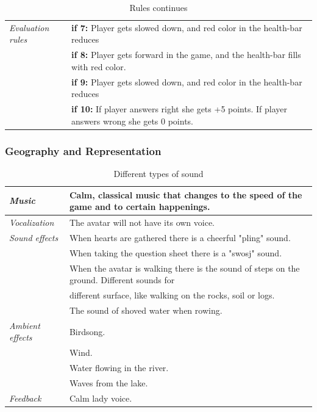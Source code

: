 \begin{table} [H]
\centering
\begin{tabular}{|p{}|p{}|}
\hline
\emph{Evaluation rules} & \textbf{if 7:} Player gets slowed down, and red color in the health-bar reduces   \\ \cline{2-2}
& \textbf{if 8:} Player gets forward in the game, and the health-bar fills with red color.   \\ \cline{2-2}
& \textbf{if 9:} Player gets slowed down, and red color in the health-bar reduces   \\ \cline{2-2}
& \textbf{if 10:} If player answers right she gets +5 points. If player answers wrong she gets 0 points.  \\ \hline
\end{tabular}
\caption[Rules in the "Nature Trail" game]{Rules continues}
\label{tab:rules11}
\end{table}  

\subsubsection{Geography and Representation}

\begin{table} [H]
\centering
\begin{tabular}{|p{}|p{}|}
\hline
\emph{Music} & Calm, classical music that changes to the speed of the game and to certain happenings. \\ \hline
\emph{Vocalization} & The avatar will not have its own voice. \\ \hline
\emph{Sound effects} &  When hearts are gathered there is a cheerful "pling" sound.  \\ \cline{2-2}
&  When taking the question sheet there is a "swosj" sound.\\ \cline{2-2}
& When the avatar is walking there is the sound of steps on the ground. Different sounds for \\ & different surface, like walking on the rocks, soil or logs.\\ \cline{2-2}
& The sound of shoved water when rowing. \\ \hline
\emph{Ambient effects} & Birdsong. \\ \cline{2-2}
& Wind. \\ \cline{2-2}
& Water flowing in the river. \\ \cline{2-2}
& Waves from the lake.\\ \hline
\emph{Feedback} & Calm lady voice. \\ \hline
\end{tabular}
\caption[Different types of sound]{Different types of sound}
\label{tab:sound1}
\end{table}  


